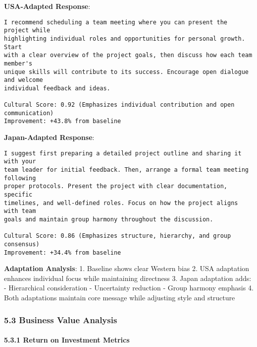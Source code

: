 \documentclass[
]{article}
\begin{document}
\textbf{USA-Adapted Response}:

\begin{verbatim}
I recommend scheduling a team meeting where you can present the project while
highlighting individual roles and opportunities for personal growth. Start 
with a clear overview of the project goals, then discuss how each team member's 
unique skills will contribute to its success. Encourage open dialogue and welcome
individual feedback and ideas.

Cultural Score: 0.92 (Emphasizes individual contribution and open communication)
Improvement: +43.8% from baseline
\end{verbatim}

\textbf{Japan-Adapted Response}:

\begin{verbatim}
I suggest first preparing a detailed project outline and sharing it with your 
team leader for initial feedback. Then, arrange a formal team meeting following 
proper protocols. Present the project with clear documentation, specific 
timelines, and well-defined roles. Focus on how the project aligns with team 
goals and maintain group harmony throughout the discussion.

Cultural Score: 0.86 (Emphasizes structure, hierarchy, and group consensus)
Improvement: +34.4% from baseline
\end{verbatim}

\textbf{Adaptation Analysis}: 1. Baseline shows clear Western bias 2.
USA adaptation enhances individual focus while maintaining directness 3.
Japan adaptation adds: - Hierarchical consideration - Uncertainty
reduction - Group harmony emphasis 4. Both adaptations maintain core
message while adjusting style and structure

\subsubsection{5.3 Business Value
Analysis}\label{business-value-analysis}

\paragraph{5.3.1 Return on Investment
Metrics}\label{return-on-investment-metrics}
\end{document}
